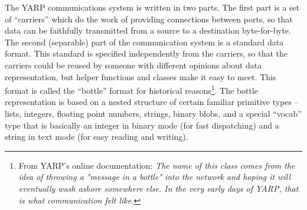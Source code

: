 The YARP communications system is written in two parts.  The 
first part is  a set of ``carriers'' which do the work of providing
connections between ports, so that data can be faithfully 
transmitted from a source to a destination byte-for-byte.
%
The second (separable) part of the communication system is a 
standard data format.  This standard is specified independently
from the carriers, so that the carriers could be reused by
someone with different opinions about data representation, but helper
functions and classes make it easy to meet.  This format is called the
``bottle'' format for historical reasons\footnote{
From YARP's online documentation:
{\it The name of this class comes from the idea of throwing a "message in a
bottle" into the network and hoping it will eventually wash ashore
somewhere else. In the very early days of YARP, that is what
communication felt like.}
}.  
%
The bottle representation is based on a nested structure of certain
familiar primitive types -- lists, integers, floating point numbers,
strings, binary blobs, and 
a special ``vocab'' type that is basically an integer in
binary mode (for fast dispatching) and a string in text mode
(for easy reading and writing).
%
%
%
